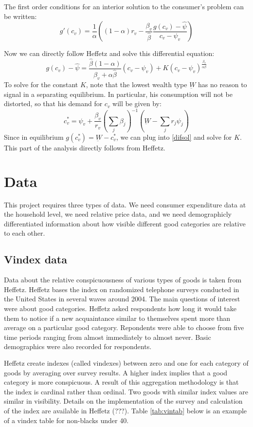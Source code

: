 \documentclass{article}
\begin{document}
The first order conditions for an interior solution to the consumer's problem can be written:
\begin{equation}
g'(c_v) = \frac{1}{\alpha}\left( \left( 1-\alpha\right) r_v - \frac{\beta_v}{\hat{\beta}}\frac{g(c_v)-\hat{\psi}}{c_v - \psi_v}\right)
\end{equation}

Now we can directly follow Heffetz and solve this differential equation:
\begin{equation}
	\label{difsol}
	g(c_v) - \hat{\psi} = \frac{\hat{\beta}\left(1-\alpha\right)}{\beta_v +\alpha \hat{\beta}} \left(c_v-\psi_v\right) + K\left(c_v-\psi_v\right)^{\frac{\beta_v}{\alpha \hat{\beta}}}
\end{equation}
To solve for the constant $K$, note that the lowest wealth type $\underbar{W}$ has no reason to signal in a separating equilibrium.
In particular, his consumption will not be distorted, so that his demand for $c_v$ will be given by:
\[
c_v^* = \psi_v + \frac{\beta_v}{r_v}\left(\sum_{j} \beta_j\right)^{-1}\left(\underbar{W} - \sum_{j} r_j \psi_j\right)
\]
Since in equilibrium $g(c_v^*) = \underbar{W} - c_v^*$, we can plug into \eqref{difsol} and solve for $K$.
This part of the analysis directly follows from Heffetz.
\section{Data}
This project requires three types of data.  We need consumer expenditure data at the household level, we need relative price data, and we need demographicly differentiated information about how visible different good categories are relative to each other. 
\subsection{Vindex data}
Data about the relative  conspicuousness of  various types of goods is taken from Heffetz.  
Heffetz bases the index on randomized telephone surveys conducted in the United States in several waves around 2004.
The main questions of interest were about good categories.
Heffetz asked respondents how long it would take them to notice if a new acquaintance similar to themselves spent more than average on a particular good category.
Repondents were able to choose from five time periods ranging from almost immediately to almost never.  
Basic demographics were also recorded for respondents.  

Heffetz create indexes (called vindexes) between zero and one for each category of goods by averaging over survey results.  
A higher index implies that a good category is  more conspicuous. 
A result of this aggregation methodology is that the index is cardinal rather than ordinal.  Two goods with similar index values are similar in visibility.  Details on the implementation of the survey and calculation of the index are available in Heffetz (???).
Table \ref{tab:vintab} below is an example of a vindex table for non-blacks under 40.
\end{document}

